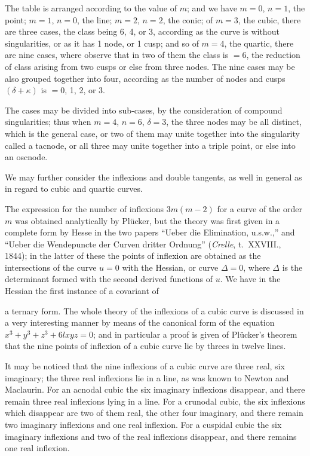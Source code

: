 \documentclass[12pt,a4paper,oneside]{book}
\begin{document}
\newpage
The table is arranged according to the value of $m$; and we have $m=0$, $n=1$, the point; $m=1$, $n=0$, the line; $m=2$, $n=2$, the conic; of $m=3$, the cubic, there are three cases, the class being 6, 4, or 3, according as the curve is without singularities, or as it has 1 node, or 1 cusp; and so of $m=4$, the quartic, there are nine cases, where observe that in two of them the class is $=6$, the reduction of class arising from two cusps or else from three nodes. The nine cases may be also grouped together into four, according as the number of nodes and cusps $(\delta+\kappa)$ is $=0$, 1, 2, or 3.

The cases may be divided into sub-cases, by the consideration of compound singularities; thus when $m=4$, $n=6$, $\delta=3$, the three nodes may be all distinct, which is the general case, or two of them may unite together into the singularity called a tacnode, or all three may unite together into a triple point, or else into an oscnode.

We may further consider the inflexions and double tangents, as well in general as in regard to cubic and quartic curves.

The expression for the number of inflexions $3m(m-2)$ for a curve of the order $m$ was obtained analytically by Pl\"ucker, but the theory was first given in a complete form by Hesse in the two papers ``Ueber die Elimination, u.s.w.,'' and ``Ueber die Wendepuncte der Curven dritter Ordnung'' (\textit{Crelle}, t.~XXVIII., 1844); in the latter of these the points of inflexion are obtained as the intersections of the curve $u=0$ with the Hessian, or curve $\Delta=0$, where $\Delta$ is the determinant formed with the second derived functions of $u$. We have in the Hessian the first instance of a covariant of

\newpage
a ternary form. The whole theory of the inflexions of a cubic curve is discussed in a very interesting manner by means of the canonical form of the equation $x^{3}+y^{3}+z^{3}+6lxyz=0$; and in particular a proof is given of Pl\"ucker's theorem that the nine points of inflexion of a cubic curve lie by threes in twelve lines.

It may be noticed that the nine inflexions of a cubic curve are three real, six imaginary; the three real inflexions lie in a line, as was known to Newton and Maclaurin. For an acnodal cubic the six imaginary inflexions disappear, and there remain three real inflexions lying in a line. For a crunodal cubic, the six inflexions which disappear are two of them real, the other four imaginary, and there remain two imaginary inflexions and one real inflexion. For a cuspidal cubic the six imaginary inflexions and two of the real inflexions disappear, and there remains one real inflexion.
\end{document}
